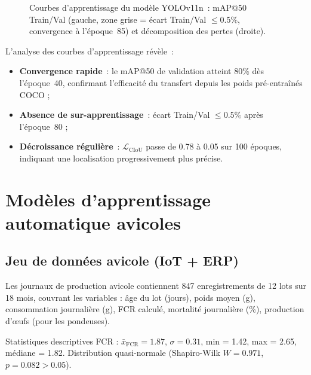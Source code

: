 \begin{figure}[H]
\caption{Courbes d'apprentissage du modèle YOLOv11n~: mAP@50 Train/Val
(gauche, zone grise = écart Train/Val $\leq 0.5\%$, convergence à l'époque~85)
et décomposition des pertes (droite).}
\label{fig:train_curves}
\end{figure}

L'analyse des courbes d'apprentissage révèle~:
\begin{itemize}
  \item \textbf{Convergence rapide}~: le mAP@50 de validation atteint 80\% dès
        l'époque~40, confirmant l'efficacité du transfert depuis les poids pré-entraînés COCO ;
  \item \textbf{Absence de sur-apprentissage}~: écart Train/Val $\leq 0.5\%$ après
        l'époque~80 ;
  \item \textbf{Décroissance régulière}~: $\mathcal{L}_\text{CIoU}$ passe de 0.78
        à 0.05 sur 100 époques, indiquant une localisation progressivement plus précise.
\end{itemize}

\section{Modèles d'apprentissage automatique avicoles}
\label{sec:avicole_models}

\subsection{Jeu de données avicole (IoT + ERP)}

Les journaux de production avicole contiennent 847 enregistrements de 12 lots
sur 18 mois, couvrant les variables : âge du lot (jours), poids moyen (g),
consommation journalière (g), FCR calculé, mortalité journalière (\%), production
d'œufs (pour les pondeuses).

Statistiques descriptives FCR :
$\bar{x}_\text{FCR} = 1.87$, $\sigma = 0.31$, min = 1.42, max = 2.65,
médiane = 1.82. Distribution quasi-normale (Shapiro-Wilk $W = 0.971$,
$p = 0.082 > 0.05$).

